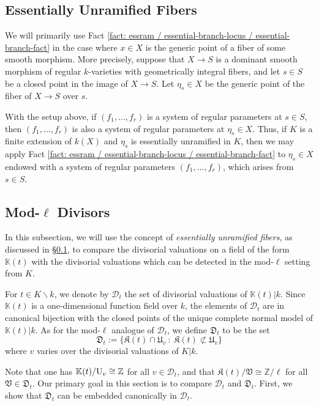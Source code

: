 \documentclass[11pt]{amsart}
\theoremstyle{definition}
\theoremstyle{remark}
\numberwithin{equation}{section}
\newcommand{\Z}{\mathbb{Z}}
\newcommand{\U}{{\rm U}}
\newcommand{\Kbb}{\mathbb{K}}
\newcommand{\Dcal}{\mathscr{D}}
\newcommand{\Kfrak}{\mathfrak{K}}
\newcommand{\Ufrak}{\mathfrak{U}}
\newcommand{\Dfrak}{\mathfrak{D}}
\newcommand{\Vfrak}{\mathfrak{V}}
\begin{document}
\subsection{Essentially Unramified Fibers}
\label{subsection: essram / essential-unram}

We will primarily use Fact \ref{fact: essram / essential-branch-locus / essential-branch-fact} in the case where $x \in X$ is the generic point of a fiber of some smooth morphism.
More precisely, suppose that $X \rightarrow S$ is a dominant smooth morphism of regular $k$-varieties with geometrically integral fibers, and let $s \in S$ be a closed point in the image of $X \rightarrow S$.
Let $\eta_s \in X$ be the generic point of the fiber of $X \rightarrow S$ over $s$.

With the setup above, if $(f_1,\ldots,f_r)$ is a system of regular parameters at $s \in S$, then $(f_1,\ldots,f_r)$ is also a system of regular parameters at $\eta_s \in X$.
Thus, if $K$ is a finite extension of $k(X)$ and $\eta_s$ is essentially unramified in $K$, then we may apply Fact \ref{fact: essram / essential-branch-locus / essential-branch-fact} to $\eta_s \in X$ endowed with a system of regular parameters $(f_1,\ldots,f_r)$, which arises from $s \in S$.

\subsection{Mod-$\ell$ Divisors}
\label{subsection: essram / mod-ell-divs}

In this subsection, we will use the concept of \emph{essentially unramified fibers}, as discussed in \S\ref{subsection: essram / essential-unram}, to compare the divisorial valuations on a field of the form $\Kbb(t)$ with the divisorial valuations which can be detected in the mod-$\ell$ setting from $K$.

For $t \in K \smallsetminus k$, we denote by $\Dcal_t$ the set of divisorial valuations of $\Kbb(t)|k$.
Since $\Kbb(t)$ is a one-dimensional function field over $k$, the elements of $\Dcal_t$ are in canonical bijection with the closed points of the unique complete normal model of $\Kbb(t)|k$.
As for the mod-$\ell$ analogue of $\Dcal_t$, we define $\Dfrak_t$ to be the set
\[ \Dfrak_t := \{ \Kfrak(t) \cap \Ufrak_v \ : \ \Kfrak(t) \not\subset \Ufrak_v \} \]
where $v$ varies over the divisorial valuations of $K|k$.

Note that one has $\Kbb(t)/\U_v \cong \Z$ for all $v \in \Dcal_t$, and that $\Kfrak(t)/\Vfrak \cong \Z/\ell$ for all $\Vfrak \in \Dfrak_t$.
Our primary goal in this section is to compare $\Dcal_t$ and $\Dfrak_t$.
First, we show that $\Dfrak_t$ can be embedded canonically in $\Dcal_t$.
\end{document}
